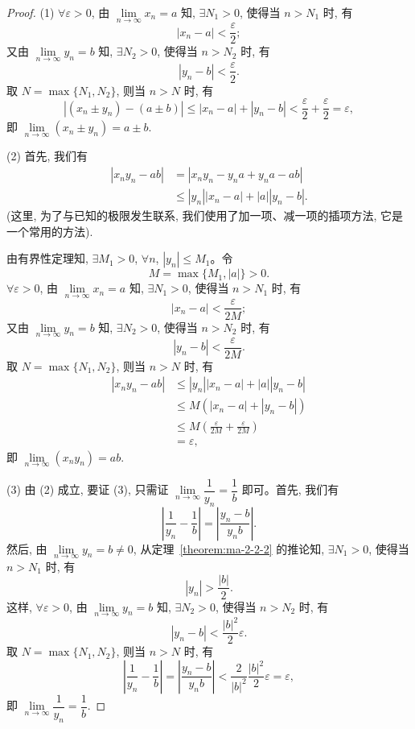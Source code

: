 \begin{proof}
(1) $\forall\varepsilon>0$, 由 $\lim\limits_{n\to\infty}x_n=a$ 知, $\exists N_1>0$, 使得当 $n>N_1$ 时, 有
\[
  |x_n-a|<\frac\varepsilon2;
\]
又由 $\lim\limits_{n\to\infty}y_n=b$ 知, $\exists N_2>0$, 使得当 $n>N_2$ 时, 有
\[
  |y_n-b|<\frac\varepsilon2.
\]
取 $N=\max\{N_1,N_2\}$, 则当 $n>N$ 时, 有
\[
  |(x_n\pm y_n)-(a\pm b)|
  \leqslant |x_n-a|+|y_n-b|
  <\frac\varepsilon2+\frac\varepsilon2=\varepsilon,
\]
即 $\lim\limits_{n\to\infty}(x_n\pm y_n)=a\pm b$.

(2) 首先, 我们有
\[
\begin{aligned}
  |x_ny_n-ab|
  &=|x_ny_n-y_na+y_na-ab|\\
  &\leqslant |y_n||x_n-a|+|a||y_n-b|.
\end{aligned}
\]
(这里, 为了与已知的极限发生联系, 我们使用了加一项、减一项的插项方法, 它是一个常用的方法).

由有界性定理知, $\exists M_1>0$, $\forall n$, $|y_n|\leqslant M_1$。令
\[
  M=\max\{M_1,|a|\}>0.
\]
$\forall\varepsilon>0$, 由 $\lim\limits_{n\to\infty}x_n=a$ 知, $\exists N_1>0$, 使得当 $n>N_1$ 时, 有
\[
  |x_n-a|<\frac{\varepsilon}{2M};
\]
又由 $\lim\limits_{n\to\infty}y_n=b$ 知, $\exists N_2>0$, 使得当 $n>N_2$ 时, 有
\[
  |y_n-b|<\frac{\varepsilon}{2M}.
\]
取 $N=\max\{N_1,N_2\}$, 则当 $n>N$ 时, 有
\[
\begin{aligned}
  |x_ny_n-ab|
  &\leqslant |y_n||x_n-a|+|a||y_n-b|\\
  &\leqslant M(|x_n-a|+|y_n-b|)\\
  &\leqslant M\left(\frac{\varepsilon}{2M}+\frac{\varepsilon}{2M}\right)\\
  &=\varepsilon,
\end{aligned}
\]
即 $\lim\limits_{n\to\infty}(x_ny_n)=ab$.

(3) 由 (2) 成立, 要证 (3), 只需证 $\lim\limits_{n\to\infty}\dfrac1{y_n}=\dfrac1b$ 即可。首先, 我们有
\[
  \left|\frac1{y_n}-\frac1b\right|
  =
  \left|\frac{y_n-b}{y_nb}\right|.
\]
然后, 由 $\lim\limits_{n\to\infty}y_n=b\ne0$, 从定理~\ref{theorem:ma-2-2-2} 的推论知, $\exists N_1>0$, 使得当 $n>N_1$ 时, 有
\[
  |y_n|>\frac{|b|}{2}.
\]
这样, $\forall\varepsilon>0$, 由 $\lim\limits_{n\to\infty}y_n=b$ 知, $\exists N_2>0$, 使得当 $n>N_2$ 时, 有
\[
  |y_n-b|<\frac{|b|^2}{2}\varepsilon.
\]
取 $N=\max\{N_1,N_2\}$, 则当 $n>N$ 时, 有
\[
  \left|\frac1{y_n}-\frac1b\right|
  =
  \left|\frac{y_n-b}{y_nb}\right|
  <
  \frac2{|b|^2}\frac{|b|^2}{2}\varepsilon
  =
  \varepsilon,
\]
即 $\lim\limits_{n\to\infty}\dfrac1{y_n}=\dfrac1b$.
\end{proof}


